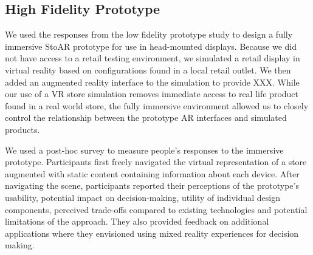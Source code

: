 \subsection{High Fidelity Prototype}
We used the responses from the low fidelity prototype study to design a fully immersive StoAR prototype for use in head-mounted displays. Because we did not have access to a retail testing environment, we simulated a retail display in virtual reality based on configurations found in a local retail outlet. We then added an augmented reality interface to the simulation to provide XXX. While our use of a VR store simulation removes immediate access to real life product found in a real world store, the fully immersive environment allowed us to closely control the relationship between the prototype AR interfaces and simulated products. %

We used a post-hoc survey to measure people's responses to the immersive prototype. Participants first freely navigated the virtual representation of a store augmented with static content containing information about each device. 
After navigating the scene, participants reported their perceptions of the prototype's usability, potential impact on decision-making, utility of individual design components, perceived trade-offs compared to existing technologies and potential limitations of the approach. They also provided feedback on additional applications where they envisioned using mixed reality experiences for decision making.  
